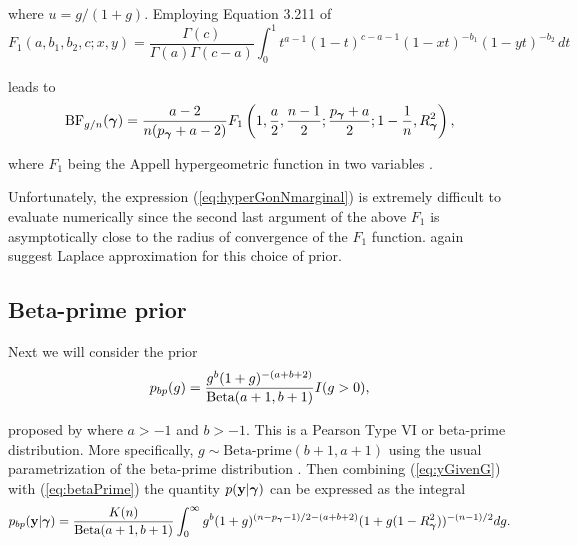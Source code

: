 \documentclass{article}[12pt]
\begin{document}
\noindent where $u=g/(1+g)$. Employing 
Equation 3.211 of \cite{Gradshteyn2007} 
$$
F_1(a,b_1,b_2,c; x,y) = \frac{\Gamma(c)} {\Gamma(a)\Gamma(c-a)} 
\int_0^1 t^{a-1} (1-t)^{c-a-1} (1-xt)^{-b_1} (1-yt)^{-b_2} \, dt
$$

\noindent 
leads to
\begin{equation}\label{eq:hyperGonNmarginal}
\displaystyle \mbox{BF}_{g/n}({\boldsymbol \gamma}) =  \frac{a - 2}{n(p_{\boldsymbol \gamma} + a - 2)} F_1\left( 1, \frac{a}{2}, \frac{n-1}{2}; \frac{p_{\boldsymbol \gamma} + a}{2}; 1  -  \frac{1}{n}, R_{\boldsymbol \gamma}^2 \right),
\end{equation}

\noindent where
$F_1$ being the Appell hypergeometric function in two variables 
\cite{Weisstein2009}. 






Unfortunately, the expression (\ref{eq:hyperGonNmarginal}) is extremely
difficult to evaluate numerically since the second last argument of the above 
$F_1$ is asymptotically close to the radius of convergence of the $F_1$
function.
\cite{Liang2008} again suggest Laplace approximation 
for this choice of prior. 

 
\subsection{Beta-prime prior} 
 
Next we will consider the prior 
\begin{equation}\label{eq:betaPrime}
\displaystyle p_{bp}(g) = \frac{g^{b}(1 + g)^{-(a+b+2)}}{\mbox{Beta}(a+1,b+1)} I(g>0),
\end{equation}

\noindent proposed by \cite{Maruyama2011} where $a>-1$ and $b>-1$. 
This is a Pearson Type VI or beta-prime distribution. More specifically, 
$g\sim \mbox{Beta-prime}(b+1,a+1)$ using the usual parametrization of 
the beta-prime distribution \citep{Johnson1995}.
Then combining (\ref{eq:yGivenG}) with (\ref{eq:betaPrime}) the quantity $p({\bf y}|{\boldsymbol \gamma})$ 
can be expressed as the integral
$$
\displaystyle p_{bp}({\bf y}|{\boldsymbol \gamma}) 
=
\frac{K(n)}{\mbox{Beta}(a+1,b+1)}
\int_0^\infty             
g^{b}(1 + g)^{(n - p_{\boldsymbol \gamma} - 1)/2 - (a + b + 2)}  (1 + g (1-R_{\boldsymbol \gamma}^2) )^{-(n-1)/2}  
dg.
$$
\end{document}
